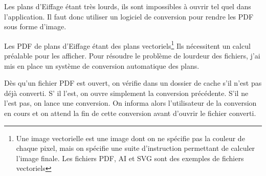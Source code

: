 Les plans d'Eiffage étant très lourds, ils sont impossibles à ouvrir tel quel dans l'application.
Il faut donc utiliser un logiciel de conversion pour rendre les PDF sous forme d'image.

Les PDF de plans d'Eiffage étant des plans vectoriels\footnote{Une image vectorielle est une image dont on ne spécifie pas la couleur de chaque pixel, mais on spécifie une suite d'instruction permettant de calculer l'image finale. Les fichiers PDF, AI et SVG sont des exemples de fichiers vectoriels} Ils nécessitent un calcul préalable pour les afficher.
Pour résoudre le problème de lourdeur des fichiers, j'ai mis en place un système de conversion automatique des plans.

\bigskip

Dès qu'un fichier PDF est ouvert, on vérifie dans un dossier de cache s'il n'est pas déjà converti.
S’ il l'est, on ouvre simplement la conversion précédente.
S'il ne l'est pas, on lance une conversion.
On informa alors l'utilisateur de la conversion en cours et on attend la fin de cette conversion avant d'ouvrir le fichier converti.

